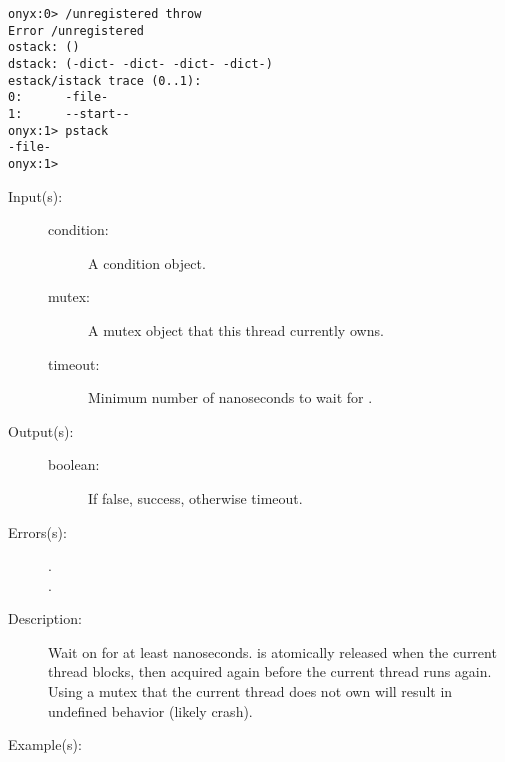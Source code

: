 \begin{description}
\begin{description}
\begin{verbatim}
onyx:0> /unregistered throw
Error /unregistered
ostack: ()
dstack: (-dict- -dict- -dict- -dict-)
estack/istack trace (0..1):
0:      -file-
1:      --start--
onyx:1> pstack
-file-
onyx:1>
		\end{verbatim}
	\end{description}
\label{systemdict:timedwait}
\item[{\onyxop{condition mutex timeout}{timedwait}{boolean}}: ]
	\begin{description}\item[]
	\item[Input(s): ]
		\begin{description}\item[]
		\item[condition: ]
			A condition object.
		\item[mutex: ]
			A mutex object that this thread currently owns.
		\item[timeout: ]
			Minimum number of nanoseconds to wait for
			.
		\end{description}
	\item[Output(s): ]
		\begin{description}\item[]
		\item[boolean: ]
			If false, success, otherwise timeout.
		\end{description}
	\item[Errors(s): ]
		\begin{description}\item[]
		\item[.]
		\item[.]
		\end{description}
	\item[Description: ]
		Wait on  for at least 
		nanoseconds.   is atomically released when the
		current thread blocks, then acquired again before the current
		thread runs again.  Using a mutex that the current thread does
		not own will result in undefined behavior (likely crash).
	\item[Example(s): ]\begin{verbatim}


\end{verbatim}
\end{description}
\end{description}
